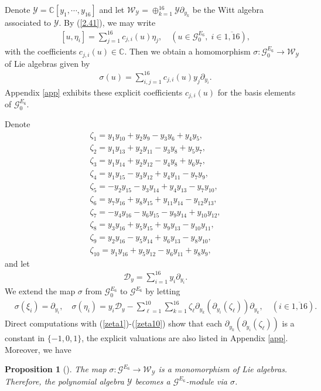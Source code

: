 \documentclass[12pt]{article}
\numberwithin{equation}{section}
\newtheorem{proposition}[theorem]{Proposition}
\theoremstyle{definition}
\theoremstyle{remark}
\begin{document}
Denote $\mathscr{Y}=\mathbb{C}[y_1,\cdots,y_{16}]$ and let $\mathscr{W}_{\mathscr{Y}}=\oplus_{k=1}^{16}\mathscr{Y}\partial_{y_k}$ be the Witt algebra associated to $\mathscr{Y}$. By (\ref{2.41}), we may write
\begin{eqnarray}
	&[u,\eta_i]=\sum\limits_{j=1}^{16}c_{j,i}(u)\eta_j,\quad (u\in\mathscr{G}^{E_6}_0,\;i\in\overline{1,16}),  \label{247}
\end{eqnarray}
with the coefficients $c_{j,i}(u)\in \mathbb{C}$. Then we obtain a homomorphism $\sigma:\mathscr{G}^{E_6}_0\longrightarrow\mathscr{W}_{\mathscr{Y}}$ of Lie algebras given by
\begin{eqnarray}
	&\sigma(u)=\sum\limits_{i,j=1}^{16}c_{j,i}(u)y_j\partial_{y_i}. \label{248}
\end{eqnarray}
Appendix \ref{app} exhibits these explicit coefficients $c_{j,i}(u)$ for the basis elements of $\mathscr{G}^{E_6}_0$.

Denote
\begin{eqnarray}
	&\zeta_1=y_1y_{10}+y_2y_9-y_3y_6+y_4y_5,\label{zeta1}\\
	&\zeta_2=y_1y_{13}+y_2y_{11}-y_3y_8+y_5y_7,\label{zeta2}\\
	&\zeta_3=y_1y_{14}+y_2y_{12}-y_4y_8+y_6y_7,\label{zeta3}\\
	&\zeta_4=y_1y_{15}-y_3y_{12}+y_4y_{11}-y_7y_9,\label{zeta4}\\
	&\zeta_5=-y_2y_{15}-y_3y_{14}+y_4y_{13}-y_7y_{10},\label{zeta5}\\
	&\zeta_6=y_7y_{16}+y_8y_{15}+y_{11}y_{14}-y_{12}y_{13},\label{zeta6}\\
	&\zeta_7=-y_{4}y_{16}-y_{6}y_{15}-y_9y_{14}+y_{10}y_{12},\label{zeta7}\\
	&\zeta_8=y_3y_{16}+y_5y_{15}+y_9y_{13}-y_{10}y_{11},\label{zeta8}\\
	&\zeta_9=y_2y_{16}-y_5y_{14}+y_6y_{13}-y_8y_{10},\label{zeta9}\\
	&\zeta_{10}=y_1y_{16}+y_5y_{12}-y_6y_{11}+y_8y_9,\label{zeta10}
\end{eqnarray}
and let
\begin{eqnarray}
	&\mathcal{D}_{y}=\sum\limits_{i=1}^{16}y_i\partial_{y_i}.
\end{eqnarray}
We extend the map $\sigma$ from $\mathscr{G}^{E_6}_0$ to $\mathscr{G}^{E_6}$ by letting
\begin{eqnarray}
	&\sigma(\xi_i)=\partial_{y_i},\quad \sigma(\eta_i)=y_i\mathcal{D}_{y}-\sum\limits_{\ell=1}^{10}\sum\limits_{k=1}^{16}\zeta_{\ell}\partial_{y_k}(\partial_{y_i}(\zeta_{\ell}))\partial_{y_k},\quad(i\in\overline{1,16}). \label{2.65}
\end{eqnarray}
Direct computations with (\ref{zeta1})-(\ref{zeta10}) show that each $\partial_{y_k}(\partial_{y_i}(\zeta_{\ell}))$ is a constant in $\{-1,0,1\}$, the explicit valuations are also listed in Appendix \ref{app}.
Moreover, we have
\begin{proposition}[]
	The map $\sigma:\mathscr{G}^{E_6}\longrightarrow\mathscr{W}_{\mathscr{Y}}$ is a monomorphism of Lie algebras. Therefore, the polynomial algebra $\mathscr{Y}$ becomes a $\mathscr{G}^{E_6}$-module via $\sigma$.
\end{proposition}
\end{document}
